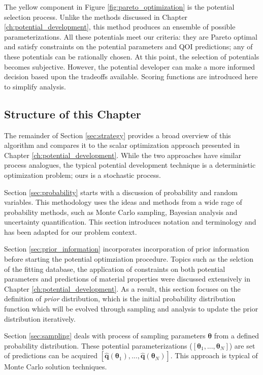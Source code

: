 The yellow component in Figure \ref{fig:pareto_optimization} is the potential selection process.  Unlike the methods discussed in Chapter \ref{ch:potential_development}, this method produces an ensemble of possible parameterizations.  All these potentials meet our criteria: they are Pareto optimal and satisfy constraints on the potential parameters and QOI predictions; any of these potentials can be rationally chosen.  At this point, the selection of potentials becomes subjective.  However, the potential developer can make a more informed decision based upon the tradeoffs available.  Scoring functions are introduced here to simplify analysis.

\subsection{Structure of this Chapter}

The remainder of Section \ref{sec:strategy} provides a broad overview of this algorithm and compares it to the scalar optimization approach presented in Chapter \ref{ch:potential_development}.  While the two approaches have similar process analogues, the typical potential development technique is a deterministic optimization problem; ours is a stochastic process.

Section \ref{sec:probability} starts with a discussion of probability and random variables.  This methodology uses the ideas and methods from a wide rage of probability methods, such as Monte Carlo sampling, Bayesian analysis and uncertainty quantification.  This section introduces notation and terminology and has been adapted for our problem context.

Section \ref{sec:prior_information} incorporates incorporation of prior information before starting the potential optimziation procedure.  Topics such as the selction of the fitting database, the application of constraints on both potential parameters and predictions of material properties were discussed extensively in Chapter \ref{ch:potential_development}.  As a result, this section focuses on the definition of \emph{prior} distribution, which is the initial probability distribution function which will be evolved through sampling and analysis to update the prior distribution iteratively.

Section \ref{sec:sampling} deals with process of sampling parameters $\bm{\theta}$ from a defined probability distribution.  These potential parameterizations ($[\bm{\theta}_1,...,\bm{\theta}_N]$) are set of predictions can be acquired $[\hat{\bm{q}}(\bm{\theta}_1),...,\hat{\bm{q}}(\bm{\theta}_N)]$. This approach is typical of Monte Carlo solution techniques.

